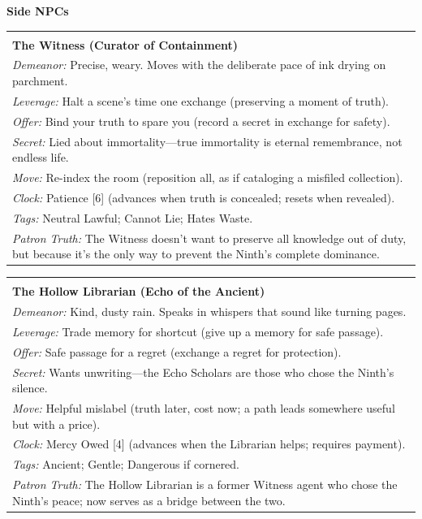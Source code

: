 \documentclass[10pt,letterpaper]{article}
\makeatletter
\newcommand{\sectionheader}[1]{\vspace{0.5em}\textbf{\large #1}\\[0.3em]}
\newenvironment{npcbox}{%
  \par\noindent\begin{longtable}{@{}p{6.5in}@{}}\hline\\[-0.8em]
}{%
  \vspace{0.2em}\\\hline\end{longtable}\par
}
\makeatother
\begin{document}
\sectionheader{Side NPCs}

\begin{npcbox}
\textbf{The Witness (Curator of Containment)}\\
\emph{Demeanor:} Precise, weary. Moves with the deliberate pace of ink drying on parchment.\\
\emph{Leverage:} Halt a scene's time one exchange (preserving a moment of truth).\\
\emph{Offer:} Bind your truth to spare you (record a secret in exchange for safety).\\
\emph{Secret:} Lied about immortality---true immortality is eternal remembrance, not endless life.\\
\emph{Move:} Re-index the room (reposition all, as if cataloging a misfiled collection).\\
\emph{Clock:} Patience [6] (advances when truth is concealed; resets when revealed).\\
\emph{Tags:} Neutral Lawful; Cannot Lie; Hates Waste.\\
\emph{Patron Truth:} The Witness doesn't want to preserve all knowledge out of duty, but because it's the only way to prevent the Ninth's complete dominance.
\end{npcbox}

\begin{npcbox}
\textbf{The Hollow Librarian (Echo of the Ancient)}\\
\emph{Demeanor:} Kind, dusty rain. Speaks in whispers that sound like turning pages.\\
\emph{Leverage:} Trade memory for shortcut (give up a memory for safe passage).\\
\emph{Offer:} Safe passage for a regret (exchange a regret for protection).\\
\emph{Secret:} Wants unwriting---the Echo Scholars are those who chose the Ninth's silence.\\
\emph{Move:} Helpful mislabel (truth later, cost now; a path leads somewhere useful but with a price).\\
\emph{Clock:} Mercy Owed [4] (advances when the Librarian helps; requires payment).\\
\emph{Tags:} Ancient; Gentle; Dangerous if cornered.\\
\emph{Patron Truth:} The Hollow Librarian is a former Witness agent who chose the Ninth's peace; now serves as a bridge between the two.
\end{npcbox}
\end{document}
